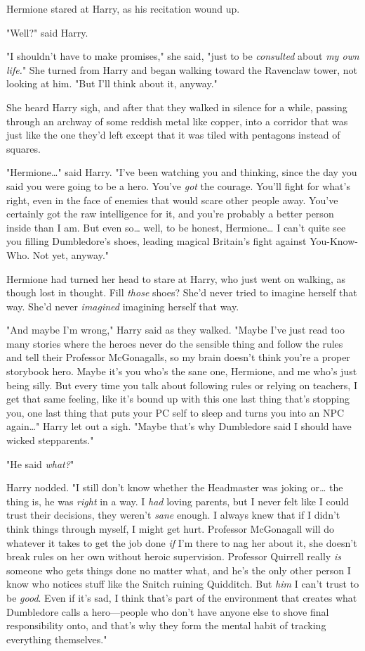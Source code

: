 Hermione stared at Harry, as his recitation wound up.

"Well?" said Harry.

"I shouldn't have to make promises," she said, "just to be \emph{consulted}
about \emph{my own life.}" She turned from Harry and began walking toward the
Ravenclaw tower, not looking at him. "But I'll think about it, anyway."

She heard Harry sigh, and after that they walked in silence for a while,
passing through an archway of some reddish metal like copper, into a corridor
that was just like the one they'd left except that it was tiled with pentagons
instead of squares.

"Hermione{\ldots}" said Harry. "I've been watching you and thinking, since the
day you said you were going to be a hero. You've \emph{got} the courage. You'll
fight for what's right, even in the face of enemies that would scare other
people away. You've certainly got the raw intelligence for it, and you're
probably a better person inside than I am. But even so{\ldots} well, to be
honest, Hermione{\ldots} I can't quite see you filling Dumbledore's shoes,
leading magical Britain's fight against You-Know-Who. Not yet, anyway."

Hermione had turned her head to stare at Harry, who just went on walking, as
though lost in thought. Fill \emph{those} shoes? She'd never tried to imagine
herself that way. She'd never \emph{imagined} imagining herself that way.

"And maybe I'm wrong," Harry said as they walked. "Maybe I've just read too
many stories where the heroes never do the sensible thing and follow the rules
and tell their Professor McGonagalls, so my brain doesn't think you're a proper
storybook hero. Maybe it's you who's the sane one, Hermione, and me who's just
being silly. But every time you talk about following rules or relying on
teachers, I get that same feeling, like it's bound up with this one last thing
that's stopping you, one last thing that puts your PC self to sleep and turns
you into an NPC again{\ldots}" Harry let out a sigh. "Maybe that's why
Dumbledore said I should have wicked stepparents."

"He said \emph{what?}"

Harry nodded. "I still don't know whether the Headmaster was joking or{\ldots}
the thing is, he was \emph{right} in a way. I \emph{had} loving parents, but I
never felt like I could trust their decisions, they weren't \emph{sane} enough.
I always knew that if I didn't think things through myself, I might get hurt.
Professor McGonagall will do whatever it takes to get the job done \emph{if}
I'm there to nag her about it, she doesn't break rules on her own without
heroic supervision. Professor Quirrell really \emph{is} someone who gets things
done no matter what, and he's the only other person I know who notices stuff
like the Snitch ruining Quidditch. But \emph{him} I can't trust to be
\emph{good}. Even if it's sad, I think that's part of the environment that
creates what Dumbledore calls a hero---people who don't have anyone else to
shove final responsibility onto, and that's why they form the mental habit of
tracking everything themselves."

